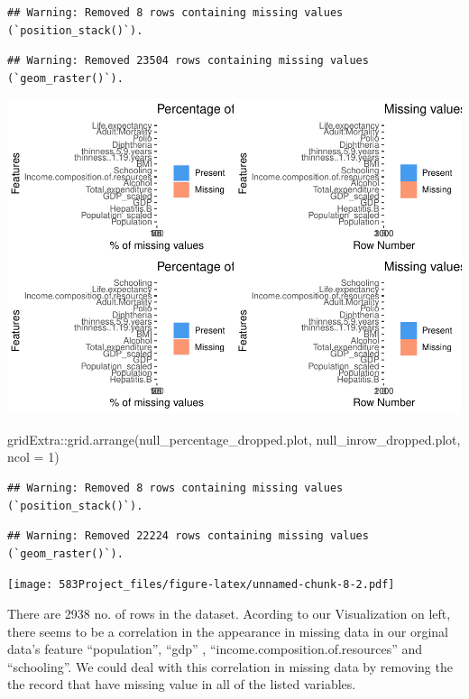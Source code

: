 \documentclass[
]{article}
\newenvironment{Shaded}{\begin{snugshade}}{\end{snugshade}}
\newcommand{\AttributeTok}[1]{\textcolor[rgb]{0.77,0.63,0.00}{#1}}
\newcommand{\DecValTok}[1]{\textcolor[rgb]{0.00,0.00,0.81}{#1}}
\newcommand{\FunctionTok}[1]{\textcolor[rgb]{0.00,0.00,0.00}{#1}}
\newcommand{\NormalTok}[1]{#1}
\newcommand{\SpecialCharTok}[1]{\textcolor[rgb]{0.00,0.00,0.00}{#1}}
\begin{document}
\begin{verbatim}
## Warning: Removed 8 rows containing missing values (`position_stack()`).
\end{verbatim}

\begin{verbatim}
## Warning: Removed 23504 rows containing missing values (`geom_raster()`).
\end{verbatim}

\includegraphics{583Project_files/figure-latex/unnamed-chunk-8-1.pdf}

\begin{Shaded}
\begin{Highlighting}[]
\NormalTok{gridExtra}\SpecialCharTok{::}\FunctionTok{grid.arrange}\NormalTok{(null\_percentage\_dropped.plot, null\_inrow\_dropped.plot, }\AttributeTok{ncol =} \DecValTok{1}\NormalTok{)}
\end{Highlighting}
\end{Shaded}

\begin{verbatim}
## Warning: Removed 8 rows containing missing values (`position_stack()`).
\end{verbatim}

\begin{verbatim}
## Warning: Removed 22224 rows containing missing values (`geom_raster()`).
\end{verbatim}

\texttt{[image: 583Project\_files/figure-latex/unnamed-chunk-8-2.pdf]}

There are 2938 no. of rows in the dataset. Acording to our Visualization
on left, there seems to be a correlation in the appearance in missing
data in our orginal data's feature ``population'', ``gdp'' ,
``income.composition.of.resources'' and ``schooling''. We could deal
with this correlation in missing data by removing the the record that
have missing value in all of the listed variables.
\end{document}
